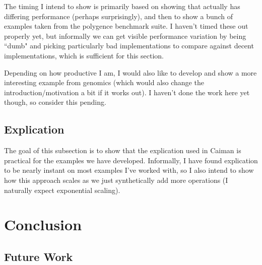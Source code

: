 The timing I intend to show is primarily based on showing that  actually has differing performance (perhaps surprisingly), and then to show a bunch of examples taken from the polygence benchmark suite.  I haven't timed these out properly yet, but informally we can get visible performance variation by being ``dumb" and picking particularly bad implementations to compare against decent implementations, which is sufficient for this section.

Depending on how productive I am, I would also like to develop and show a more interesting example from genomics (which would also change the introduction/motivation a bit if it works out).  I haven't done the work here yet though, so consider this pending.

\subsection{Explication}
\label{subsec:explicationresults}

The goal of this subsection is to show that the explication used in Caiman is practical for the examples we have developed.  Informally, I have found explication to be nearly instant on most examples I've worked with, so I also intend to show how this approach scales as we just synthetically add more operations (I naturally expect exponential scaling).

\section{Conclusion}
\label{sec:conclusion}


\subsection{Future Work}
\label{subsec:future}

